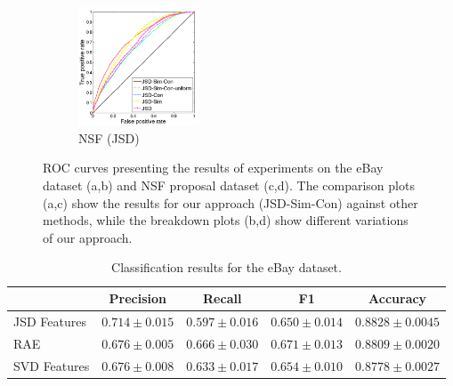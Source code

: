 \documentclass{article} %
\begin{document}
\begin{figure}
        \begin{subfigure}[b]{0.24\textwidth}
        	        \centering
                \includegraphics[width=36mm]{figures/nsf-breakdown-kopia.png}
               \caption{NSF (JSD)}
                \label{fig:nsf-breakdown}
        \end{subfigure}
       \caption{ROC curves presenting the results of experiments on
         the eBay dataset (a,b) and NSF proposal dataset (c,d). The
         comparison plots (a,c) show the results for our approach (JSD-Sim-Con)
         against other methods, while the breakdown plots (b,d)
         show different variations of our approach. }\label{fig:roc-curves}
\end{figure}


\begin{table}[t]
\caption{Classification results for the eBay dataset.}
\label{tab:classification-results}
\vspace{-4mm}
\begin{center}
\begin{tabular}{|l|c|c|c|c|}
\hline
&Precision & Recall & F1 & Accuracy
\\ \hline 
JSD Features         &$\mathbf{0.714}\pm 0.015$&$0.597\pm 0.016$&$0.650\pm
0.014$& $\mathbf{0.8828}\pm 0.0045$\\
RAE             &$0.676\pm 0.005$&$\mathbf{0.666}\pm 0.030$&$\mathbf{0.671}\pm
0.013$&$0.8809\pm 0.0020$ \\
SVD Features             &$0.676\pm 0.008$&$0.633\pm 0.017$&$0.654\pm
0.010$&$0.8778\pm 0.0027$\\
\hline
\end{tabular}
\end{center}
\end{table}










\end{document}
